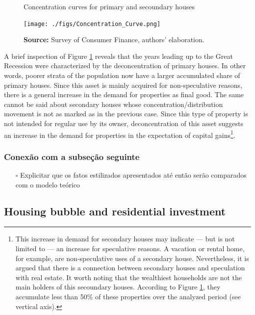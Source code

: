 \documentclass[11pt]{article}
\begin{document}
\begin{figure}[htb]
    \centering
        \caption{Concentration curves for primary and secoundary houses} 
    \texttt{[image: ./figs/Concentration\_Curve.png]}
    \label{fig:concentration}
    \caption*{\textbf{Source:} Survey of Consumer Finance, authors’ elaboration.}
\end{figure}


A brief inspection of Figure \ref{fig:concentration} reveals that the years leading up to the Great Recession were characterized by the deconcentration of primary houses. In other words, poorer strata of the population now have a larger accumulated share of primary houses. 
Since this asset is mainly acquired for non-speculative reasons, there is a general increase in the demand for properties as final good. The same cannot be said about secondary houses whose concentration/distribution movement is not as marked as in the previous case. Since this type of property is not intended for regular use by its owner, deconcentration of this asset suggests an increase in the demand for properties in the expectation of capital gains\footnote{This increase in demand for secondary houses may indicate --- but is not limited to --- an increase for speculative reasons. A vacation or rental home, for example, are non-speculative uses of a secondary house. Nevertheless, it is argued that there is a connection between secondary houses and speculation with real estate. It worth noting that the wealthiest households are not the main holders of this secoundary houses. According to Figure \ref{fig:concentration}, they accumulate less than 50\% of these properties over the analyzed period (see vertical axis).}.

\subsubsection{Conexão com a subseção seguinte}
\label{sec:org8062181}


\begin{itemize}
\item[{$\square$}] Explicitar que os fatos estilizados apresentados até então serão comparados com o modelo teórico
\end{itemize}

\subsection{Housing bubble and residential investment}
\label{sec:orgc396d07}
\end{document}
